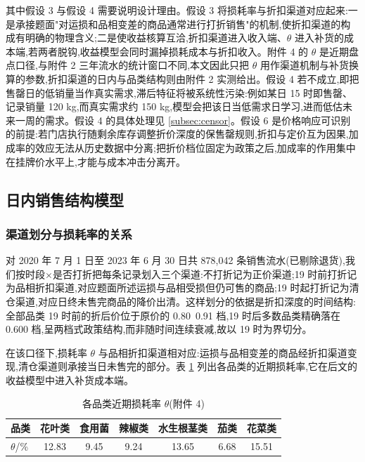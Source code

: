 其中假设 3 与假设 4 需要说明设计理由。假设 3 将损耗率与折扣渠道对应起来:一是承接题面"对运损和品相变差的商品通常进行打折销售"的机制,使折扣渠道的构成有明确的物理含义;二是使收益核算互洽,折扣渠道进入收入端、$\theta$ 进入补货的成本端,若两者脱钩,收益模型会同时漏掉损耗成本与折扣收入。附件 4 的 $\theta$ 是近期盘点口径,与附件 2 三年流水的统计窗口不同,本文因此只把 $\theta$ 用作渠道机制与补货换算的参数,折扣渠道的日内与品类结构则由附件 2 实测给出。假设 4 若不成立,即把售罄日的低销量当作真实需求,滞后特征将被系统性污染:例如某日 15 时即售罄、记录销量 120 kg,而真实需求约 150 kg,模型会把该日当低需求日学习,进而低估未来一周的需求。假设 4 的具体处理见 \ref{subsec:censor}。假设 6 是价格响应可识别的前提:若门店执行随剩余库存调整折价深度的保售罄规则,折扣与定价互为因果,加成率的效应无法从历史数据中分离;把折价档位固定为政策之后,加成率的作用集中在挂牌价水平上,才能与成本冲击分离开。

\subsection{日内销售结构模型}

\subsubsection{渠道划分与损耗率的关系}

对 2020 年 7 月 1 日至 2023 年 6 月 30 日共 878{,}042 条销售流水(已剔除退货),我们按时段$\times$是否打折把每条记录划入三个渠道:不打折记为正价渠道;19 时前打折记为品相折扣渠道,对应题面所述运损与品相受损但仍可售的商品;19 时起打折记为清仓渠道,对应日终未售完商品的降价出清。这样划分的依据是折扣深度的时间结构:全部品类 19 时前的折后价位于原价的 0.80~0.91 档,19 时后多数品类精确落在 0.600 档,呈两档式政策结构,而非随时间连续衰减,故以 19 时为界切分。

在该口径下,损耗率 $\theta$ 与品相折扣渠道相对应:运损与品相变差的商品经折扣渠道变现,清仓渠道则承接当日未售完的部分。表 \ref{tab:theta} 列出各品类的近期损耗率,它在后文的收益模型中进入补货成本端。

\begin{table}[htbp]
  \centering
  \caption{各品类近期损耗率 $\theta$(附件 4)}
  \label{tab:theta}
  \begin{tabular}{lcccccc}
    \toprule
    品类 & 花叶类 & 食用菌 & 辣椒类 & 水生根茎类 & 茄类 & 花菜类 \\
    \midrule
    $\theta$/\% & 12.83 & 9.45 & 9.24 & 13.65 & 6.68 & 15.51 \\
    \bottomrule
  \end{tabular}
\end{table}

